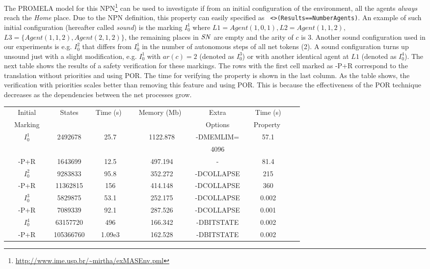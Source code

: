 \documentclass{llncs}
\begin{document}
The PROMELA model for this NPN\footnote{\small\url{http://www.ime.usp.br/~mirtha/exMASEnv.pml}\nfont} can be used to investigate if from an initial configuration of the environment, all the agents \emph{always} reach the \emph{Home} place. Due to the NPN definition, this property can easily specified as \small\verb" <>(Results==NumberAgents)"\nfont. An example of such initial configuration (hereafter called \emph{sound}) is the marking $I_0^1$ where $L1=Agent(1, 0, 1),L2=Agent(1, 1, 2),$ $L3=\{Agent(1, 1, 2),Agent(2, 1, 2)\}$, the remaining places in ${\it SN}$ are empty and the arity of $c$ is 3. Another sound configuration used in our experiments is e.g. $I_0^2$ that differs from $I_0^1$ in the number of autonomous steps of all net tokens (2). A sound configuration turns up unsound just with a slight modification, e.g. $I_0^1$ with  $ar(c)=2$ (denoted as $I_0^3$) or with another identical agent at $L1$ (denoted as $I_0^4$). The next table shows the results of a safety verification for these markings. The rows with the first cell marked as -P+R correspond to the translation without priorities and using POR. The time for verifying the property is shown in the last column. As the table shows, the verification with priorities scales better than removing this feature and using POR. This is because the effectiveness of the POR technique decreases as the dependencies between the net processes grow.


\vspace{10pt}
\begin{center}\begin{tabular}{|c|c|c|c|c|c|c|}
      \hline
      \ \ Initial\ \  &\ \ States\ \ &\ Time (s)\ \ &\ Memory (Mb)\ \ &\ Extra\ &\ \ Time (s)\ \ \\
      \ \ Marking\ \  &\ \ \ \ &\ \ \ &\ \ \ &\ Options\ &\ \ Property \ \ \\
      \hline
      $I_0^1$  & 2492678  & 25.7 & 1122.878 &  -DMEMLIM=  &  57.1 \\
             &          &      &          &      4096   &    \\
      \hline
      -P+R        & 1643699  & 12.5 & 497.194 & - & 81.4  \\
      \hline
      $I_0^2$ & 9283833  & 95.8 &   352.272 & -DCOLLAPSE &  215 \\
      \hline
      -P+R       & 11362815  & 156 &   414.148   & -DCOLLAPSE &  360 \\
      \hline
      $I_0^3$ & 5829875  & 53.1 &   252.175 & -DCOLLAPSE &   0.002 \\
      \hline
      -P+R      & 7089339  &  92.1 & 287.526 & -DCOLLAPSE & 0.001 \\
      \hline
      $I_0^4$ & 63157720  & 496 & 166.342 & -DBITSTATE & 0.002 \\ \hline
      -P+R        &  105366760  & 1.09e3 & 162.528 & -DBITSTATE & 0.002 \\ \hline
\end{tabular}\end{center}
\vspace{10pt}
\end{document}
